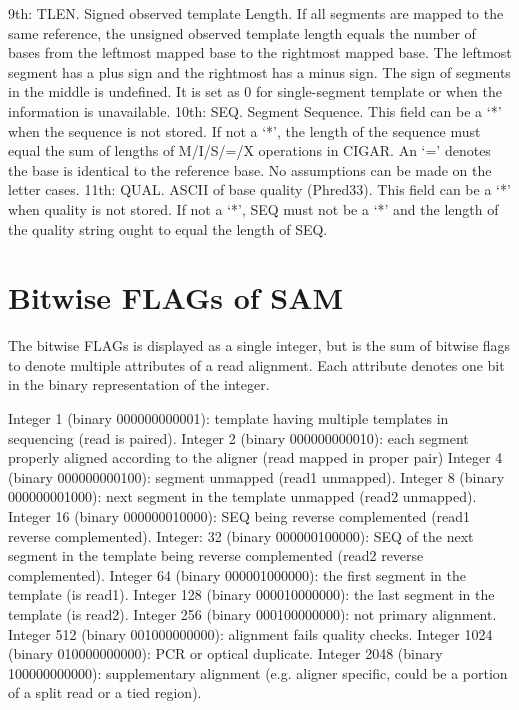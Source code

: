 \documentclass[11pt]{article}
\begin{document}
9th: TLEN. 
Signed observed template Length. 
If all segments are mapped to the same reference, the unsigned observed template length equals the number of bases from the leftmost mapped base to the rightmost mapped base. 
The leftmost segment has a plus sign and the rightmost has a minus sign. 
The sign of segments in the middle is undefined. 
It is set as 0 for single-segment template or when the information is unavailable.
\newline
10th: SEQ. 
Segment Sequence. This field can be a ‘*’ when the sequence is not stored. 
If not a ‘*’, the length of the sequence must equal the sum of lengths of M/I/S/=/X operations in CIGAR. 
An ‘=’ denotes the base is identical to the reference base. 
No assumptions can be made on the letter cases.
\newline
11th: QUAL. 
ASCII of base quality (Phred33). 
This field can be a ‘*’ when quality is not stored. 
If not a ‘*’, SEQ must not be a ‘*’ and the length of the quality string ought to equal the length of SEQ.

\section{Bitwise FLAGs of SAM}
The bitwise FLAGs is displayed as a single integer, but is the sum of bitwise flags to denote multiple attributes of a read alignment. 
Each attribute denotes one bit in the binary representation of the integer.

\newline
Integer 1 (binary 000000000001): 
template having multiple templates in sequencing (read is paired).
\newline
Integer 2 (binary 000000000010): 
each segment properly aligned according to the aligner (read mapped in proper pair)
\newline
Integer 4 (binary	000000000100): 
segment unmapped (read1 unmapped).
\newline
Integer 8 (binary 000000001000): 
next segment in the template unmapped (read2 unmapped).
\newline
Integer 16 (binary 000000010000): 
SEQ being reverse complemented (read1 reverse complemented).
\newline
Integer: 32 (binary 000000100000): 
SEQ of the next segment in the template being reverse complemented (read2 reverse complemented).
\newline
Integer 64 (binary 000001000000): 
the first segment in the template (is read1).
\newline
Integer 128 (binary 000010000000): 
the last segment in the template (is read2).
\newline
Integer 256 (binary 000100000000): 
not primary alignment.
\newline
Integer 512 (binary 001000000000): 
alignment fails quality checks.
\newline
Integer 1024 (binary 010000000000): 
PCR or optical duplicate.
\newline
Integer 2048 (binary 100000000000): 
supplementary alignment (e.g. aligner specific, could be a portion of a split read or a tied region). 
\end{document}
